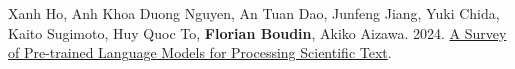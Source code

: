 \item Xanh Ho, Anh Khoa Duong Nguyen, An Tuan Dao, Junfeng Jiang, Yuki Chida, Kaito Sugimoto, Huy Quoc To, \textbf{Florian Boudin}, Akiko Aizawa.
2024.
\href{https://arxiv.org/pdf/2401.17824}{A Survey of Pre-trained Language Models for Processing Scientific Text}.
\label{ho-etal-2024-survey}
